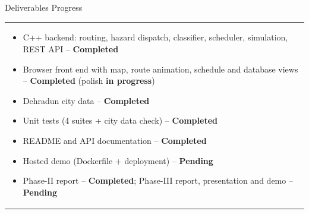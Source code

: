 \documentclass[12pt,a4paper]{article}
\newcommand{\sectiontitle}[1]{%
    {\color{GEUBlue}
    \fontsize{18}{22}\selectfont #1}
}
\newcommand{\answerbox}[2]{%
    \begin{tabularx}{\textwidth}{
        |>{\raggedright\arraybackslash}X|}
        \hline
        \parbox[t][#1][t]{\dimexpr\linewidth-12pt\relax}{
            \vspace{5pt}
            \fontsize{11}{13.5}\selectfont
            \setlength{\parskip}{4pt}
            #2
        }\\
        \hline
    \end{tabularx}
}
\begin{document}
\vspace{0.65cm}

\sectiontitle{Deliverables Progress}

\vspace{0.05cm}


\vspace{0.25cm}

\answerbox{4.9cm}{\begin{itemize}
\item C++ backend: routing, hazard dispatch, classifier, scheduler, simulation, REST API -- \textbf{Completed}
\item Browser front end with map, route animation, schedule and database views -- \textbf{Completed} (polish \textbf{in progress})
\item Dehradun city data -- \textbf{Completed}
\item Unit tests (4 suites + city data check) -- \textbf{Completed}
\item README and API documentation -- \textbf{Completed}
\item Hosted demo (Dockerfile + deployment) -- \textbf{Pending}
\item Phase-II report -- \textbf{Completed}; Phase-III report, presentation and demo -- \textbf{Pending}
\end{itemize}}
\end{document}
